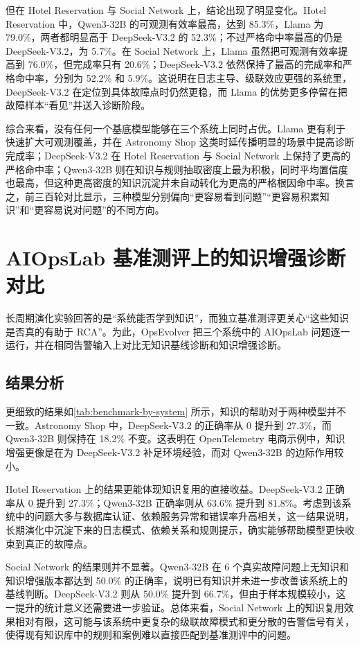 但在 Hotel Reservation 与 Social Network 上，结论出现了明显变化。Hotel Reservation 中，Qwen3-32B 的可观测有效率最高，达到 85.3\%，Llama 为 79.0\%，两者都明显高于 DeepSeek-V3.2 的 52.3\%；不过严格命中率最高的仍是 DeepSeek-V3.2，为 5.7\%。在 Social Network 上，Llama 虽然把可观测有效率提高到 76.0\%，但完成率只有 20.6\%；DeepSeek-V3.2 依然保持了最高的完成率和严格命中率，分别为 52.2\% 和 5.9\%。这说明在日志主导、级联效应更强的系统里，DeepSeek-V3.2 在定位到具体故障点时仍然更稳，而 Llama 的优势更多停留在把故障样本“看见”并送入诊断阶段。

综合来看，没有任何一个基底模型能够在三个系统上同时占优。Llama 更有利于快速扩大可观测覆盖，并在 Astronomy Shop 这类时延传播明显的场景中提高诊断完成率；DeepSeek-V3.2 在 Hotel Reservation 与 Social Network 上保持了更高的严格命中率；Qwen3-32B 则在知识与规则抽取密度上最为积极，同时平均置信度也最高，但这种更高密度的知识沉淀并未自动转化为更高的严格根因命中率。换言之，前三百轮对比显示，三种模型分别偏向“更容易看到问题”“更容易积累知识”和“更容易说对问题”的不同方向。

\section{AIOpsLab 基准测评上的知识增强诊断对比}
\label{sec:benchmark_comparison}

长周期演化实验回答的是“系统能否学到知识”，而独立基准测评更关心“这些知识是否真的有助于 RCA”。为此，OpsEvolver 把三个系统中的 AIOpsLab 问题逐一运行，并在相同告警输入上对比无知识基线诊断和知识增强诊断。

\subsection{结果分析}

更细致的结果如\autoref{tab:benchmark-by-system} 所示，知识的帮助对于两种模型并不一致。Astronomy Shop 中，DeepSeek-V3.2 的正确率从 0 提升到 27.3\%，而 Qwen3-32B 则保持在 18.2\% 不变。这表明在 OpenTelemetry 电商示例中，知识增强更像是在为 DeepSeek-V3.2 补足环境经验，而对 Qwen3-32B 的边际作用较小。

Hotel Reservation 上的结果更能体现知识复用的直接收益。DeepSeek-V3.2 正确率从 0 提升到 27.3\%；Qwen3-32B 正确率则从 63.6\% 提升到 81.8\%。考虑到该系统中的问题大多与数据库认证、依赖服务异常和错误率升高相关，这一结果说明，长期演化中沉淀下来的日志模式、依赖关系和规则提示，确实能够帮助模型更快收束到真正的故障点。

Social Network 的结果则并不显著。Qwen3-32B 在 6 个真实故障问题上无知识和知识增强版本都达到 50.0\% 的正确率，说明已有知识并未进一步改善该系统上的基线判断。DeepSeek-V3.2 则从 50.0\% 提升到 66.7\%，但由于样本规模较小，这一提升的统计意义还需要进一步验证。总体来看，Social Network 上的知识复用效果相对有限，这可能与该系统中更复杂的级联故障模式和更分散的告警信号有关，使得现有知识库中的规则和案例难以直接匹配到基准测评中的问题。

